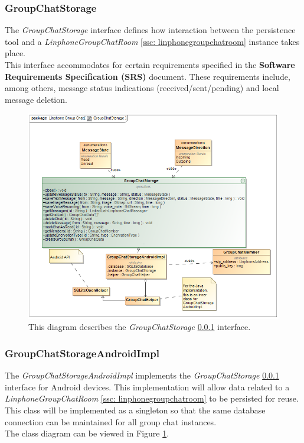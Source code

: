 \documentclass[11pt]{article}
\begin{document}
\subsubsection{GroupChatStorage}\label{ssc: groupchatstorage}
The \textit{GroupChatStorage} interface defines how interaction between the persistence tool and a \textit{LinphoneGroupChatRoom} \ref{ssc: linphonegroupchatroom} instance takes place.\\
This interface accommodates for certain requirements specified in the \textbf{Software Requirements Specification (SRS)} document. These requirements include, among others, message status indications (received/sent/pending) and local message deletion.
\begin{figure}[H]
\centering
\centerline{\includegraphics[width=6in]{./images/class_chat_storage.png}}
	\caption[GroupChatStorage Class Diagram]{This diagram describes the \textit{GroupChatStorage} \ref{ssc: groupchatstorage} interface.}
	\label{cd-chat-storage}
\end{figure}
\subsubsection{GroupChatStorageAndroidImpl}\label{ssc: groupchatstorageandroidimpl}
The \textit{GroupChatStorageAndroidImpl} implements the \textit{GroupChatStorage} \ref{ssc: groupchatstorage} interface for Android devices. This implementation will allow data related to a \textit{LinphoneGroupChatRoom} \ref{ssc: linphonegroupchatroom} to be persisted for reuse.\\
This class will be implemented as a singleton so that the same database connection can be maintained for all group chat instances.\\
The class diagram can be viewed in Figure \ref{cd-chat-storage}.\\
\end{document}
